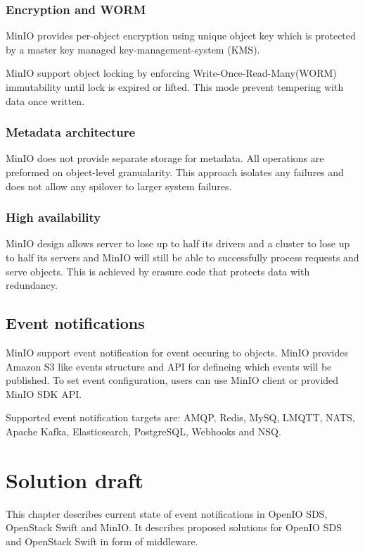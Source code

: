     \subsection*{Encryption and WORM}
    MinIO provides per-object encryption using unique object key which is protected by a master key managed key-management-system (KMS).

    MinIO support object locking by enforcing Write-Once-Read-Many(WORM) immutability until lock is expired or lifted. This mode prevent tempering with data once written\cite{minioHighPerformance}.

    \subsection*{Metadata architecture}
    MinIO does not provide separate storage for metadata. All operations are preformed on object-level granualarity. This approach isolates any failures and does not allow any spilover to larger system failures\cite{minioIntel}.

    \subsection*{High availability}
    MinIO design allows server to lose up to half its drivers and a cluster to lose up to half its servers and MinIO will still be able to successfully process requests and serve objects. This is achieved by erasure code that protects data with redundancy\cite{minioIntel}.

\section{Event notifications}
    MinIO support event notification for event occuring to objects. MinIO provides Amazon S3 like events structure and API for defineing which events will be published. To set event configuration, users can use MinIO client or provided MinIO SDK API.

    Supported event notification targets are: AMQP, Redis, MySQ, LMQTT, NATS, Apache Kafka, Elasticsearch, PostgreSQL, Webhooks and NSQ.

\chapter{Solution draft}
    This chapter describes current state of event notifications in OpenIO SDS, OpenStack Swift and MinIO. It describes proposed solutions for OpenIO SDS and OpenStack Swift in form of middleware.
